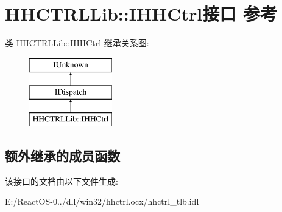 \hypertarget{interface_h_h_c_t_r_l_lib_1_1_i_h_h_ctrl}{}\section{H\+H\+C\+T\+R\+L\+Lib\+:\+:I\+H\+H\+Ctrl接口 参考}
\label{interface_h_h_c_t_r_l_lib_1_1_i_h_h_ctrl}
类 H\+H\+C\+T\+R\+L\+Lib\+:\+:I\+H\+H\+Ctrl 继承关系图\+:\begin{figure}[H]
\begin{center}
\leavevmode
\includegraphics[height=3.000000cm]{interface_h_h_c_t_r_l_lib_1_1_i_h_h_ctrl}
\end{center}
\end{figure}
\subsection*{额外继承的成员函数}


该接口的文档由以下文件生成\+:\begin{DoxyCompactItemize}
\item 
E\+:/\+React\+O\+S-\/0../dll/win32/hhctrl.\+ocx/hhctrl\+\_\+tlb.\+idl\end{DoxyCompactItemize}
